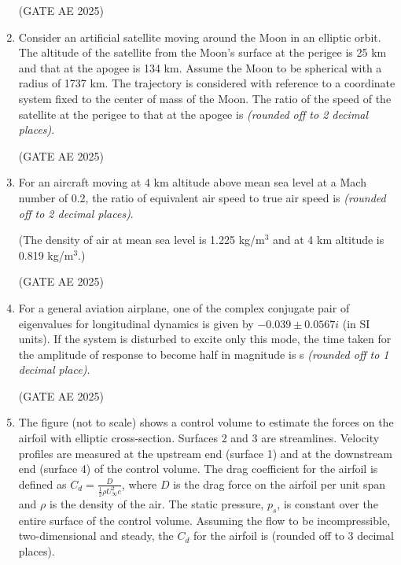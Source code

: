 \documentclass[journal,12pt,onecolumn]{IEEEtran}
\theoremstyle{remark}
\begin{document}
\begin{flushleft}
\begin{enumerate}
\hfill (GATE AE 2025)

\item Consider an artificial satellite moving around the Moon in an elliptic orbit. The altitude of the satellite from the Moon's surface at the perigee is 25 km and that at the apogee is 134 km. Assume the Moon to be spherical with a radius of 1737 km. The trajectory is considered with reference to a coordinate system fixed to the center of mass of the Moon. The ratio of the speed of the satellite at the perigee to that at the apogee is \underline{\hspace{3cm}} \textit{(rounded off to 2 decimal places)}.

\hfill (GATE AE 2025)

\item For an aircraft moving at 4 km altitude above mean sea level at a Mach number of 0.2, the ratio of equivalent air speed to true air speed is \underline{\hspace{3cm}} \textit{(rounded off to 2 decimal places)}.  

(The density of air at mean sea level is 1.225 kg/m$^3$ and at 4 km altitude is 0.819 kg/m$^3$.)

\hfill (GATE AE 2025)

\item For a general aviation airplane, one of the complex conjugate pair of eigenvalues for longitudinal dynamics is given by $-0.039 \pm 0.0567 i$ (in SI units). If the system is disturbed to excite only this mode, the time taken for the amplitude of response to become half in magnitude is \underline{\hspace{3cm}} s \textit{(rounded off to 1 decimal place)}.

\hfill (GATE AE 2025)

\item The figure (not to scale) shows a control volume to estimate the forces on the airfoil with elliptic cross-section. Surfaces 2 and 3 are streamlines. Velocity profiles are measured at the upstream end (surface 1) and at the downstream end (surface 4) of the control volume. The drag coefficient for the airfoil is defined as
$C_d = \frac{D}{\frac12 \rho U_\infty^2 c}$,
where $D$ is the drag force on the airfoil per unit span and $\rho$ is the density of the air. The static pressure, $p_s$, is constant over the entire surface of the control volume. Assuming the flow to be incompressible, two-dimensional and steady, the $C_d$ for the airfoil is \underline{\hspace{3cm}} (rounded off to 3 decimal places). 


\end{enumerate}
\end{flushleft}
\end{document}
